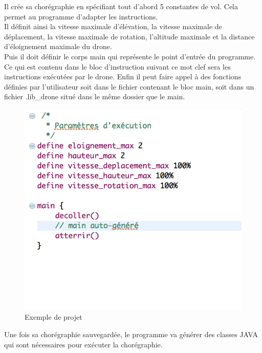 \documentclass[12pt]{article}
\begin{document}
        \newpage
        Il crée sa chorégraphie en spécifiant tout d'abord 5 constantes de vol. Cela permet au programme d'adapter les instructions. \\
        Il définit ainsi la vitesse maximale d'élévation, la vitesse maximale de déplacement, la vitesse maximale de rotation, l'altitude maximale et la distance d'éloignement maximale du drone. \\
        Puis il doit définir le corps main qui représente le point d'entrée du programme. Ce qui est contenu dans le bloc d'instruction suivant ce mot clef sera les instructions exécutées par le drone. Enfin il peut faire appel à des fonctions définies par l'utilisateur soit dans le fichier contenant le bloc main, soit dans un fichier .lib\_drone situé dans le même dossier que le main.
        
        \begin{figure}[!h]
        \centering
        \includegraphics[scale=0.60]{07.png}
        \caption{Exemple de projet}
        \end{figure}
        
        \newpage
        Une fois sa chorégraphie sauvegardée, le programme va générer des classes JAVA qui sont nécessaires pour exécuter la chorégraphie.
        
\end{document}
